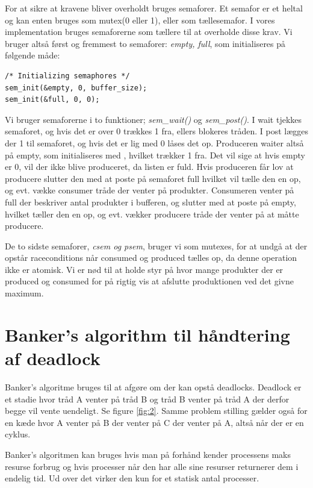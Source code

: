 \documentclass[danish]{report}
\begin{document}
For at sikre at kravene bliver overholdt bruges semaforer. Et semafor er et heltal og kan enten bruges som mutex(0 eller 1), eller som tællesemafor. I vores implementation bruges semaforerne som tællere til at overholde disse krav. Vi bruger altså først og fremmest to semaforer: \textit{empty, full}, som initialiseres på følgende måde:

\begin{lstlisting}    
/* Initializing semaphores */
sem_init(&empty, 0, buffer_size);
sem_init(&full, 0, 0);
\end{lstlisting}

Vi bruger semaforerne i to funktioner; \textit{sem\_wait()} og \textit{sem\_post()}. I wait tjekkes semaforet, og hvis det er over 0 trækkes 1 fra, ellers blokeres tråden. I post lægges der 1 til semaforet, og hvis det er lig med 0 låses det op. Produceren waiter altså på empty, som initialiseres med , hvilket trækker 1 fra. Det vil sige at hvis empty er 0, vil der ikke blive produceret, da listen er fuld. Hvis produceren får lov at producere slutter den med at poste på semaforet full hvilket vil tælle den en op, og evt. vække consumer tråde der venter på produkter. Consumeren venter på full der beskriver antal produkter i bufferen, og slutter med at poste på empty, hvilket tæller den en op, og evt. vækker producere tråde der venter på at måtte producere.

De to sidste semaforer, \textit{csem og psem}, bruger vi som mutexes, for at undgå at der opstår raceconditions når consumed og produced tælles op, da denne operation ikke er atomisk. Vi er nød til at holde styr på hvor mange produkter der er produced og consumed for på rigtig vis at afslutte produktionen ved det givne maximum.


\chapter{Banker’s algorithm til håndtering af deadlock}

Banker's algoritme bruges til at afgøre om der kan opstå deadlocks. Deadlock er et stadie hvor tråd A venter på tråd B og tråd B venter på tråd A der derfor begge vil vente uendeligt. Se figure \ref{fig:2}. Samme problem stilling gælder også for en kæde hvor A venter på B der venter på C der venter på A, altså når der er en cyklus.

Banker's algoritmen kan bruges hvis man på forhånd kender processens maks resurse forbrug og hvis processer når den har alle sine resurser returnerer dem i endelig tid. Ud over det virker den kun for et statisk antal processer.
\end{document}
